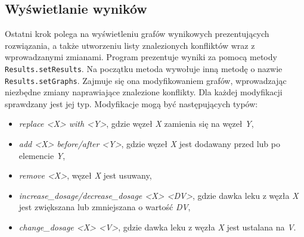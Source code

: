 
\subsection{Wyświetlanie wyników}
\label{sect:revisions}
Ostatni krok polega na wyświetleniu grafów wynikowych prezentujących rozwiązania, a także utworzeniu listy znalezionych konfliktów wraz z wprowadzanymi zmianami. Program prezentuje wyniki za pomocą metody \texttt{Results.setResults}. Na początku metoda wywołuje inną metodę o nazwie \texttt{Results.setGraphs}. 
Zajmuje się ona modyfikowaniem grafów, wprowadzając niezbędne zmiany naprawiające znalezione konflikty.
Dla każdej modyfikacji sprawdzany jest jej typ. Modyfikacje mogą być następujących typów:
\begin{itemize}
\item \textit{replace <X> with <Y>}, gdzie węzeł \textit{X} zamienia się na węzeł \textit{Y},
\item \textit{add <X> before/after <Y>}, gdzie węzeł \textit{X} jest dodawany przed lub po elemencie \textit{Y},
\item \textit{remove <X>}, węzeł \textit{X} jest usuwany,
\item \textit{increase\_dosage/decrease\_dosage <X> <DV>}, gdzie dawka leku z węzła \textit{X} jest zwiększana lub zmniejszana o wartość \textit{DV},
\item \textit{change\_dosage <X> <V>}, gdzie dawka leku z węzła \textit{X} jest ustalana na \textit{V}.  
\end{itemize}

